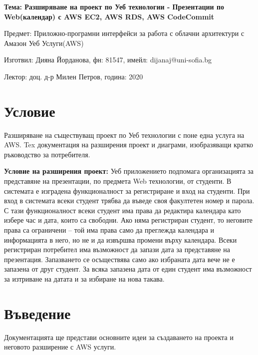\documentclass[12pt]{article}
\begin{document}
	\begin{center}
        \LARGE{\textbf{Тема: Разширяване на проект по Уеб технологии - Презентации по Web(календар) с AWS EC2, AWS RDS, AWS CodeCommit}}
        
        \bigskip
        \Large{Предмет: Приложно-програмни интерфейси за работа с облачни архитектури с Амазон Уеб Услуги(AWS)}
        
        \medskip
        \Large{Изготвил: Дияна Йорданова, фн: 81547, имейл: dijanaj@uni-sofia.bg}
        
        \medskip
        \Large{Лектор: доц. д-р Милен Петров, година: 2020}
        
        \bigskip
	\end{center}
    
    
    \tableofcontents
    \bigskip
    \bigskip
    \newpage
  
\section{Условие} 

\noindent Разширяване на съществуващ проект по Уеб технологии с поне една услуга на AWS. Tex документация на разширения проект и диаграми, изобразяващи кратко ръководство за потребителя.   
\medskip


\noindent \textbf{Условие на разширения проект:} 
\noindent Уеб приложението подпомага организацията за представяне на презентации, по предмета Web технологии, от студенти. В системата е изградена функционалност за регистриране и вход на студенти. При вход в системата всеки студент трябва да въведе своя факултетен номер и парола. С тази функционалност всеки студент има права да редактира календара като избере час и дата, които са свободни. Ако няма регистриран студент, то неговите права са ограничени – той има права само да преглежда календара и информацията в него, но не и да извършва промени върху календара. Всеки регистриран потребител има възможност да запази дата за представяне на презентация. Запазването се осъществява само ако избраната дата вече не е запазена от друг студент. За всяка запазена дата от един студент има възможност за изтриване на датата и за избиране на нова такава.   
\section{Въведение}

Документацията ще представи основните идеи за създаването на проекта и неговото разширение с AWS услуги.
\medskip
\end{document}
